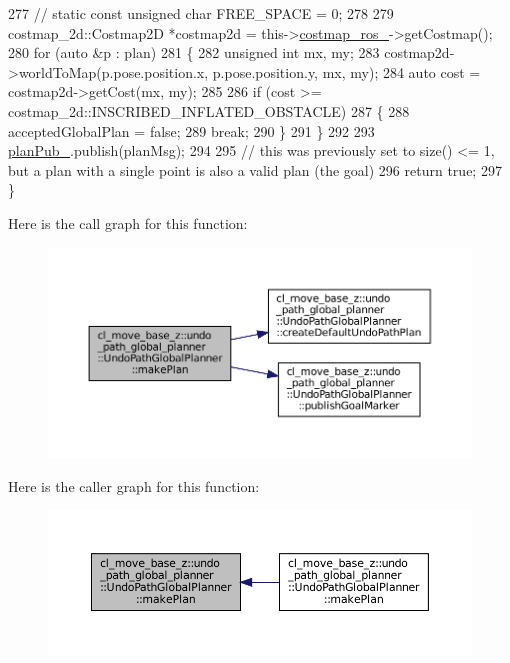 \begin{DoxyCode}
277             \textcolor{comment}{// static const unsigned char FREE\_SPACE = 0;}
278 
279             costmap\_2d::Costmap2D *costmap2d = this->\hyperlink{classcl__move__base__z_1_1undo__path__global__planner_1_1UndoPathGlobalPlanner_ab63eeb465e3ae989a6edcc4d059cf8f0}{costmap\_ros\_}->getCostmap();
280             \textcolor{keywordflow}{for} (\textcolor{keyword}{auto} &p : plan)
281             \{
282                 \textcolor{keywordtype}{unsigned} \textcolor{keywordtype}{int} mx, my;
283                 costmap2d->worldToMap(p.pose.position.x, p.pose.position.y, mx, my);
284                 \textcolor{keyword}{auto} cost = costmap2d->getCost(mx, my);
285 
286                 \textcolor{keywordflow}{if} (cost >= costmap\_2d::INSCRIBED\_INFLATED\_OBSTACLE)
287                 \{
288                     acceptedGlobalPlan = \textcolor{keyword}{false};
289                     \textcolor{keywordflow}{break};
290                 \}
291             \}
292 
293             \hyperlink{classcl__move__base__z_1_1undo__path__global__planner_1_1UndoPathGlobalPlanner_a65bf364a122d5950baf1bf8b42309d68}{planPub\_}.publish(planMsg);
294 
295             \textcolor{comment}{// this was previously set to size() <= 1, but a plan with a single point is also a valid plan
       (the goal)}
296             \textcolor{keywordflow}{return} \textcolor{keyword}{true};
297         \}
\end{DoxyCode}
Here is the call graph for this function\+:
\nopagebreak
\begin{figure}[H]
\begin{center}
\leavevmode
\includegraphics[width=350pt]{classcl__move__base__z_1_1undo__path__global__planner_1_1UndoPathGlobalPlanner_a46034d27c0811abae440009457a7f8b0_cgraph}
\end{center}
\end{figure}
Here is the caller graph for this function\+:
\nopagebreak
\begin{figure}[H]
\begin{center}
\leavevmode
\includegraphics[width=350pt]{classcl__move__base__z_1_1undo__path__global__planner_1_1UndoPathGlobalPlanner_a46034d27c0811abae440009457a7f8b0_icgraph}
\end{center}
\end{figure}
